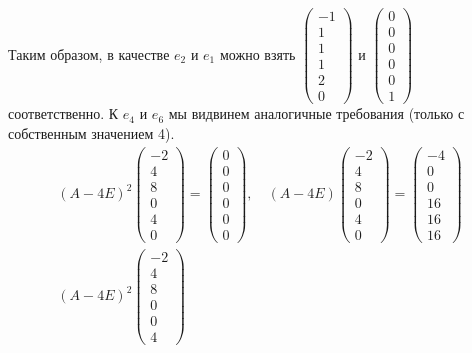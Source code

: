 Таким образом, в качестве $e_2$ и $e_1$ можно взять $\begin{pmatrix}-1\\1\\1\\1\\2\\0\end{pmatrix}$ и $\begin{pmatrix}0\\0\\0\\0\\0\\1\end{pmatrix}$ соответственно.
К $e_4$ и $e_6$ мы видвинем аналогичные требования (только с собственным значением 4).
\begin{gather*}
    (A - 4E)^2\begin{pmatrix}
        -2\\4\\8\\0\\4\\0
    \end{pmatrix} = \begin{pmatrix}
        0\\0\\0\\0\\0\\0
    \end{pmatrix},\quad
    (A - 4E)\begin{pmatrix}
        -2\\4\\8\\0\\4\\0
    \end{pmatrix} = \begin{pmatrix}
        -4\\0\\0\\16\\16\\16
    \end{pmatrix}\\
    (A - 4E)^2\begin{pmatrix}
        -2\\4\\8\\0\\0\\4

\end{pmatrix}
\end{gather*}
